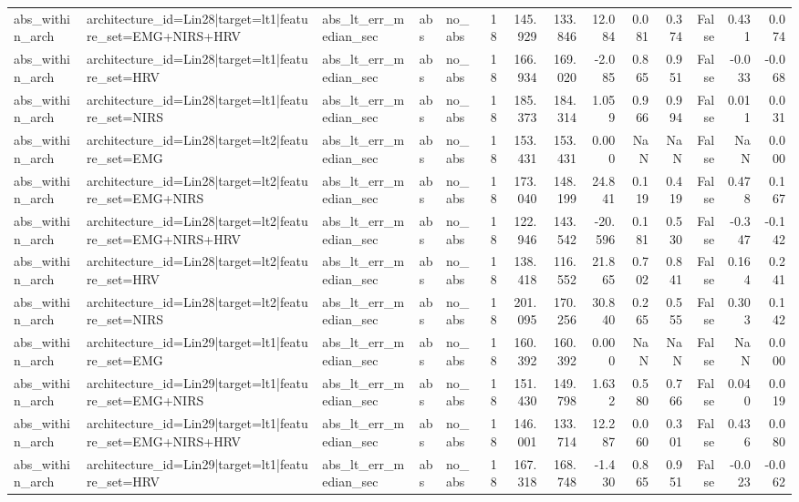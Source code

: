 \begin{table}
\begin{tabular}{lllllrrrrrrrrr}
abs_within_arch & architecture_id=Lin28|target=lt1|feature_set=EMG+NIRS+HRV & abs_lt_err_median_sec & abs & no_abs & 18 & 145.929 & 133.846 & 12.084 & 0.081 & 0.374 & False & 0.431 & 0.074 \\
abs_within_arch & architecture_id=Lin28|target=lt1|feature_set=HRV & abs_lt_err_median_sec & abs & no_abs & 18 & 166.934 & 169.020 & -2.085 & 0.865 & 0.951 & False & -0.033 & -0.068 \\
abs_within_arch & architecture_id=Lin28|target=lt1|feature_set=NIRS & abs_lt_err_median_sec & abs & no_abs & 18 & 185.373 & 184.314 & 1.059 & 0.966 & 0.994 & False & 0.011 & 0.031 \\
abs_within_arch & architecture_id=Lin28|target=lt2|feature_set=EMG & abs_lt_err_median_sec & abs & no_abs & 18 & 153.431 & 153.431 & 0.000 & NaN & NaN & False & NaN & 0.000 \\
abs_within_arch & architecture_id=Lin28|target=lt2|feature_set=EMG+NIRS & abs_lt_err_median_sec & abs & no_abs & 18 & 173.040 & 148.199 & 24.841 & 0.119 & 0.419 & False & 0.478 & 0.167 \\
abs_within_arch & architecture_id=Lin28|target=lt2|feature_set=EMG+NIRS+HRV & abs_lt_err_median_sec & abs & no_abs & 18 & 122.946 & 143.542 & -20.596 & 0.181 & 0.530 & False & -0.347 & -0.142 \\
abs_within_arch & architecture_id=Lin28|target=lt2|feature_set=HRV & abs_lt_err_median_sec & abs & no_abs & 18 & 138.418 & 116.552 & 21.865 & 0.702 & 0.841 & False & 0.164 & 0.241 \\
abs_within_arch & architecture_id=Lin28|target=lt2|feature_set=NIRS & abs_lt_err_median_sec & abs & no_abs & 18 & 201.095 & 170.256 & 30.840 & 0.265 & 0.555 & False & 0.303 & 0.142 \\
abs_within_arch & architecture_id=Lin29|target=lt1|feature_set=EMG & abs_lt_err_median_sec & abs & no_abs & 18 & 160.392 & 160.392 & 0.000 & NaN & NaN & False & NaN & 0.000 \\
abs_within_arch & architecture_id=Lin29|target=lt1|feature_set=EMG+NIRS & abs_lt_err_median_sec & abs & no_abs & 18 & 151.430 & 149.798 & 1.632 & 0.580 & 0.766 & False & 0.040 & 0.019 \\
abs_within_arch & architecture_id=Lin29|target=lt1|feature_set=EMG+NIRS+HRV & abs_lt_err_median_sec & abs & no_abs & 18 & 146.001 & 133.714 & 12.287 & 0.060 & 0.301 & False & 0.436 & 0.080 \\
abs_within_arch & architecture_id=Lin29|target=lt1|feature_set=HRV & abs_lt_err_median_sec & abs & no_abs & 18 & 167.318 & 168.748 & -1.430 & 0.865 & 0.951 & False & -0.023 & -0.062 \\

\end{tabular}
\end{table}
